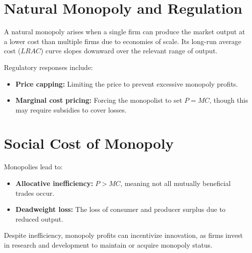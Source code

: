 \section*{Natural Monopoly and Regulation}
A natural monopoly arises when a single firm can produce the market output at a lower cost than multiple firms due to economies of scale. Its long-run average cost (\(LRAC\)) curve slopes downward over the relevant range of output.

Regulatory responses include:
\begin{itemize}
    \item \textbf{Price capping:} Limiting the price to prevent excessive monopoly profits.
    \item \textbf{Marginal cost pricing:} Forcing the monopolist to set \(P = MC\), though this may require subsidies to cover losses.
\end{itemize}

\section*{Social Cost of Monopoly}
Monopolies lead to:
\begin{itemize}
    \item \textbf{Allocative inefficiency:} \(P > MC\), meaning not all mutually beneficial trades occur.
    \item \textbf{Deadweight loss:} The loss of consumer and producer surplus due to reduced output.
\end{itemize}

Despite inefficiency, monopoly profits can incentivize innovation, as firms invest in research and development to maintain or acquire monopoly status.
